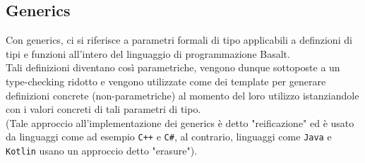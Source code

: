 \subsection{Generics}
Con generics, ci si riferisce a parametri formali di tipo applicabili a definzioni 
di tipi e funzioni all'intero del linguaggio di programmazione Basalt. \\

Tali definizioni diventano così parametriche, vengono dunque sottoposte a un type-checking ridotto
e vengono utilizzate come dei template per generare definizioni concrete (non-parametriche) al momento
del loro utilizzo istanziandole con i valori concreti di tali parametri di tipo. \\

(Tale approccio all'implementazione dei generics è detto "reificazione"
ed è usato da linguaggi come ad esempio \texttt{C++} e \texttt{C\#}, al contrario, linguaggi come
\texttt{Java} e \texttt{Kotlin} usano un approccio detto "erasure").





